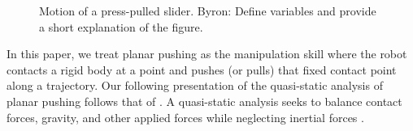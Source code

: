 \documentclass[conference]{IEEEtran}
\newcommand{\BB}[1]{{\color{red} {Byron: {#1}}}}
\begin{document}
\begin{figure}[t]
  \centering
  \def\iangle{35} %
  \caption{Motion of a press-pulled slider. \BB{Define variables and provide a short explanation of the figure.}}
  \label{fig:presspull-motion}
\end{figure}

In this paper, we treat planar pushing as the manipulation skill where
the robot contacts a rigid body at a point and pushes (or pulls) that
fixed contact point along a trajectory.
Our following presentation of the quasi-static analysis of planar
pushing follows that of \cite{alexander1993bounds, Mason}. A
quasi-static analysis seeks to balance contact forces, gravity, and
other applied forces while neglecting inertial forces \cite{Mason}.
\end{document}
